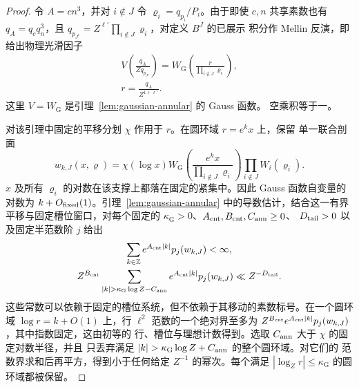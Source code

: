 \begin{proof}
令 $A=cn^3$，并对 $i\notin J$ 令 $\varrho_i=q_{p_i}/P_i$。由于即使 $c,n$
共享素数也有 $q_A=q_cq_n^3$，且
$q_{p_{J^c}}=Z^{\ell'}\prod_{i\notin J}\varrho_i$，对定义 $B^J$ 的已展示
积分作 Mellin 反演，即给出物理光滑因子
\[
 \begin{gathered}
 V\!\left(\frac{q_A}{Zq_{p_{J^c}}}\right)
 =W_{\mathrm G}\!\left(\frac{r}{\prod_{i\notin J}\varrho_i}\right),\\
 r=\frac{q_A}{Z^{1+\ell'}}.
 \end{gathered}
\]
这里 $V=W_{\mathrm G}$ 是引理~\ref{lem:gaussian-annular} 的 Gauss 函数。
空乘积等于一。

对该引理中固定的平移分划 $\chi$ 作用于 $r$。在圆环域 $r=e^kx$ 上，保留
单一联合剖面
\[
 w_{k,J}(x,\boldsymbol\varrho)
 =\chi(\log x)W_{\mathrm G}\!\left(
       \frac{e^kx}{\prod_{i\notin J}\varrho_i}\right)
       \prod_{i\notin J}W_i(\varrho_i).
\]
$x$ 及所有 $\varrho_i$ 的对数在该支撑上都落在固定的紧集中。因此 Gauss
函数自变量的对数为 $k+O_{\rm fixed}(1)$。引理~\ref{lem:gaussian-annular}
中的导数估计，结合这一有界平移与固定槽位窗口，对每个固定的
$\kappa_{\mathrm G}>0$、$A_{\rm cnt},B_{\rm cnt},C_{\rm ann}\ge0$、
$D_{\rm tail}>0$ 以及固定半范数阶 $j$ 给出
\[
 \begin{gathered}
 \sum_{k\in\mathbb Z}e^{A_{\rm cnt}|k|}p_j(w_{k,J})<\infty,
 \\
 Z^{B_{\rm cnt}}
 \sum_{|k|>\kappa_{\mathrm G}\log Z-C_{\rm ann}}
       e^{A_{\rm cnt}|k|}p_j(w_{k,J})
       \ll Z^{-D_{\rm tail}}.
 \end{gathered}
\]
这些常数可以依赖于固定的槽位系统，但不依赖于其移动的素数标号。在一个圆环域
$\log r=k+O(1)$ 上，行 $\ell^2$ 范数的一个绝对界至多为
$Z^{B_{\rm cnt}}e^{A_{\rm cnt}|k|}p_j(w_{k,J})$，其中指数固定，这由初等的
行、槽位与理想计数得到。选取 $C_{\rm ann}$ 大于 $\chi$ 的固定对数半径，并且
只丢弃满足 $|k|>\kappa_{\mathrm G}\log Z+C_{\rm ann}$ 的整个圆环域。对它们的
范数界求和后再平方，得到小于任何给定 $Z^{-1}$ 的幂次。每个满足
$|\log_Z r|\le\kappa_{\mathrm G}$ 的圆环域都被保留。


\end{proof}
